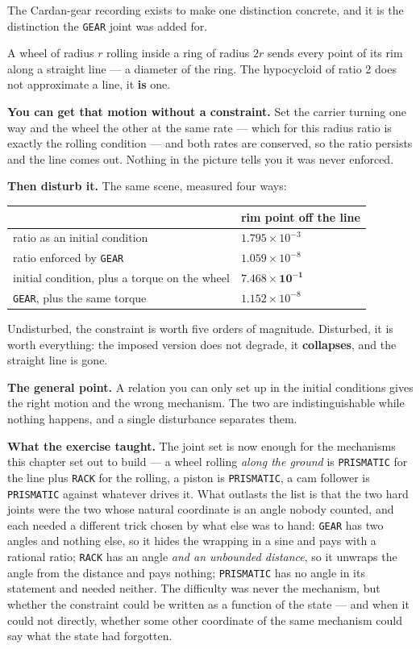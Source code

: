 \documentclass[11pt]{article}
\newcommand{\kw}[1]{\texttt{\uppercase{#1}}}
\begin{document}
The Cardan-gear recording exists to make one distinction concrete, and
it is the distinction the \kw{gear} joint was added for.

A wheel of radius $r$ rolling inside a ring of radius $2r$ sends every
point of its rim along a straight line --- a diameter of the ring. The
hypocycloid of ratio 2 does not approximate a line, it \textbf{is} one.

\textbf{You can get that motion without a constraint.} Set the carrier
turning one way and the wheel the other at the same rate --- which for
this radius ratio is exactly the rolling condition --- and both rates
are conserved, so the ratio persists and the line comes out. Nothing in
the picture tells you it was never enforced.

\textbf{Then disturb it.} The same scene, measured four ways:

\begin{center}
\begin{tabular}{p{8.0cm}p{4.6cm}}
& \textbf{rim point off the line}\\\hline
ratio as an initial condition & $1.795\times10^{-3}$\\
ratio enforced by \kw{gear} & $1.059\times10^{-8}$\\
initial condition, plus a torque on the wheel & $\mathbf{7.468\times10^{-1}}$\\
\kw{gear}, plus the same torque & $1.152\times10^{-8}$\\
\end{tabular}
\end{center}

Undisturbed, the constraint is worth five orders of magnitude.
Disturbed, it is worth everything: the imposed version does not degrade,
it \textbf{collapses}, and the straight line is gone.

\textbf{The general point.} A relation you can only set up in the
initial conditions gives the right motion and the wrong mechanism. The
two are indistinguishable while nothing happens, and a single
disturbance separates them.

\textbf{What the exercise taught.} The joint set is now enough for the
mechanisms this chapter set out to build --- a wheel rolling
\emph{along the ground} is \kw{prismatic} for the line plus \kw{rack}
for the rolling, a piston is \kw{prismatic}, a cam follower is
\kw{prismatic} against whatever drives it. What outlasts the list is
that the two hard joints were the two whose natural coordinate is an
angle nobody counted, and each needed a different trick chosen by what
else was to hand: \kw{gear} has two angles and nothing else, so it hides
the wrapping in a sine and pays with a rational ratio; \kw{rack} has an
angle \emph{and an unbounded distance}, so it unwraps the angle from the
distance and pays nothing; \kw{prismatic} has no angle in its statement
and needed neither. The difficulty was never the mechanism, but whether
the constraint could be written as a function of the state --- and when
it could not directly, whether some other coordinate of the same
mechanism could say what the state had forgotten.
\end{document}
